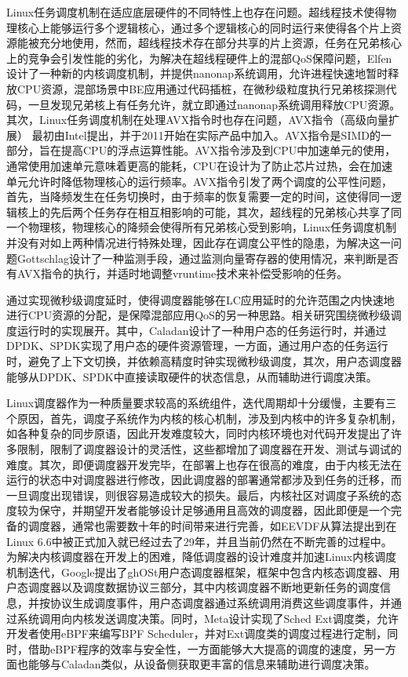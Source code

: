 Linux任务调度机制在适应底层硬件的不同特性上也存在问题。超线程技术使得物理核心上能够运行多个逻辑核心，通过多个逻辑核心的同时运行来使得各个片上资源能被充分地使用，然而，超线程技术存在部分共享的片上资源，任务在兄弟核心上的竞争会引发性能的劣化，为解决在超线程硬件上的混部QoS保障问题，Elfen\citep{yang2016elfen}设计了一种新的内核调度机制，并提供nanonap系统调用，允许进程快速地暂时释放CPU资源，混部场景中BE应用通过代码插桩，在微秒级粒度执行兄弟核探测代码，一旦发现兄弟核上有任务允许，就立即通过nanonap系统调用释放CPU资源。其次，Linux任务调度机制在处理AVX指令时也存在问题，AVX指令（高级向量扩展）\citep{guide2011intel} 最初由Intel提出，并于2011开始在实际产品中加入。AVX指令是SIMD的一部分，旨在提高CPU的浮点运算性能。AVX指令涉及到CPU中加速单元的使用，通常使用加速单元意味着更高的能耗，CPU在设计为了防止芯片过热，会在加速单元允许时降低物理核心的运行频率。AVX指令引发了两个调度的公平性问题，首先，当降频发生在任务切换时，由于频率的恢复需要一定的时间，这使得同一逻辑核上的先后两个任务存在相互相影响的可能，其次，超线程的兄弟核心共享了同一个物理核，物理核心的降频会使得所有兄弟核心受到影响，Linux任务调度机制并没有对如上两种情况进行特殊处理，因此存在调度公平性的隐患，为解决这一问题Gottschlag\citep{gottschlag2020avx}设计了一种监测手段，通过监测向量寄存器的使用情况，来判断是否有AVX指令的执行，并适时地调整vruntime技术来补偿受影响的任务。

通过实现微秒级调度延时，使得调度器能够在LC应用延时的允许范围之内快速地进行CPU资源的分配，是保障混部应用QoS的另一种思路。相关研究围绕微秒级调度运行时的实现\citep{ousterhout2019shenango,fried2020caladan,prekas2017zygos}展开。其中，Caladan\citep{fried2020caladan}设计了一种用户态的任务运行时，并通过DPDK、SPDK实现了用户态的硬件资源管理，一方面，通过用户态的任务运行时，避免了上下文切换，并依赖高精度时钟实现微秒级调度，其次，用户态调度器能够从DPDK、SPDK中直接读取硬件的状态信息，从而辅助进行调度决策。

Linux调度器作为一种质量要求较高的系统组件，迭代周期却十分缓慢，主要有三个原因，首先，调度子系统作为内核的核心机制，涉及到内核中的许多复杂机制，如各种复杂的同步原语，因此开发难度较大，同时内核环境也对代码开发提出了许多限制，限制了调度器设计的灵活性，这些都增加了调度器在开发、测试与调试的难度\citep{humphries2021ghost}。其次，即便调度器开发完毕，在部署上也存在很高的难度，由于内核无法在运行的状态中对调度器进行修改，因此调度器的部署通常都涉及到任务的迁移，而一旦调度出现错误，则很容易造成较大的损失。最后，内核社区对调度子系统的态度较为保守，并期望开发者能够设计足够通用且高效的调度器，因此即便是一个完备的调度器，通常也需要数十年的时间带来进行完善\citep{agache2020firecracker}，如EEVDF从算法提出到在Linux 6.6中被正式加入就已经过去了29年，并且当前仍然在不断完善的过程中。为解决内核调度器在开发上的困难，降低调度器的设计难度并加速Linux内核调度机制迭代，Google提出了ghOSt\citep{humphries2021ghost}用户态调度器框架，框架中包含内核态调度器、用户态调度器以及调度数据协议三部分，其中内核调度器不断地更新任务的调度信息，并按协议生成调度事件，用户态调度器通过系统调用消费这些调度事件，并通过系统调用向内核发送调度决策。同时，Meta设计实现了Sched Ext调度类，允许开发者使用eBPF来编写BPF Scheduler，并对Ext调度类的调度过程进行定制，同时，借助eBPF程序的效率与安全性，一方面能够大大提高的调度的速度，另一方面也能够与Caladan类似，从设备侧获取更丰富的信息来辅助进行调度决策。
 
